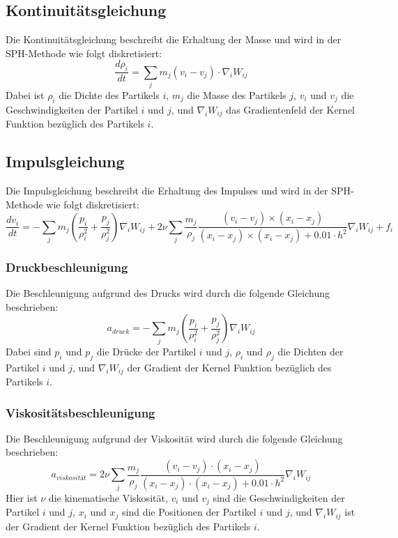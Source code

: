 \documentclass[a4paper, 12pt]{article}
\begin{document}
\subsection{Kontinuitätsgleichung}
Die Kontinuitätsgleichung beschreibt die Erhaltung der Masse und wird in der SPH-Methode wie folgt diskretisiert:
\[
\frac{d\rho_i}{dt} = \sum_j m_j (v_i - v_j) \cdot \nabla_i W_{ij}
\]
Dabei ist \(\rho_i\) die Dichte des Partikels \(i\), \(m_j\) die Masse des Partikels \(j\), \(v_i\) und \(v_j\) die Geschwindigkeiten der Partikel \(i\) und \(j\), und \(\nabla_i W_{ij}\) das Gradientenfeld der Kernel Funktion bezüglich des Partikels \(i\).

\subsection{Impulsgleichung}
Die Impulsgleichung beschreibt die Erhaltung des Impulses und wird in der SPH-Methode wie folgt diskretisiert:
\[
\frac{d v_i}{dt} = -\sum_j m_j \left( \frac{p_i}{\rho_i^2} + \frac{p_j}{\rho_j^2} \right) \nabla_i W_{ij} + 2 \nu \sum_j \frac{m_j}{\rho_j} \frac{(v_i - v_j) \times (x_i - x_j)}{(x_i - x_j) \times (x_i - x_j) + 0.01\cdot h^2} \nabla_i W_{ij} + f_i
\]

\subsubsection{Druckbeschleunigung}
Die Beschleunigung aufgrund des Drucks wird durch die folgende Gleichung \cite{monaghan1992smoothed} beschrieben:
\begin{equation} \label{equ:druckBesch}
	a_{druck} = -\sum_j m_j \left( \frac{p_i}{\rho_i^2} + \frac{p_j}{\rho_j^2} \right) \nabla_i W_{ij}
\end{equation}
Dabei sind \( p_i \) und \( p_j \) die Drücke der Partikel \( i \) und \( j \), \(\rho_i \) und \(\rho_j \) die Dichten der Partikel \( i \) und \( j \), und \( \nabla_i W_{ij} \) der Gradient der Kernel Funktion bezüglich des Partikels \( i \).

\subsubsection{Viskositätsbeschleunigung}
Die Beschleunigung aufgrund der Viskosität wird durch die folgende Gleichung \cite{monaghan1992smoothed} beschrieben:
\begin{equation} \label{equ:viskositätBesch}
	a_{viskosität} = 2 \nu \sum_j \frac{m_j}{\rho_j} \frac{(v_i - v_j) \cdot (x_i - x_j)}{(x_i - x_j) \cdot (x_i - x_j) + 0.01\cdot h^2} \nabla_i W_{ij}
\end{equation}
Hier ist \(\nu\) die kinematische Viskosität, \( v_i \) und \( v_j \) sind die Geschwindigkeiten der Partikel \( i \) und \( j \), \( x_i \) und \( x_j \) sind die Positionen der Partikel \( i \) und \( j \), und \(\nabla_i W_{ij}\) ist der Gradient der Kernel Funktion bezüglich des Partikels \( i \).
\end{document}
